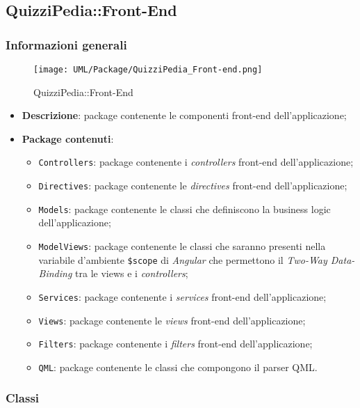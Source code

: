 \subsection{QuizziPedia::Front-End}
\subsubsection{Informazioni generali}
\label{QuizziPedia::Front-End}
\begin{figure}[ht]
	\centering
	\texttt{[image: UML/Package/QuizziPedia\_Front-end.png]}
	\caption{QuizziPedia::Front-End}
\end{figure}
\FloatBarrier
	\begin{itemize}
		\item \textbf{Descrizione}: package contenente le componenti front-end dell'applicazione;
		\item \textbf{Package contenuti}:
		\begin{itemize}
			\item \texttt{Controllers}: package contenente i \textit{controllers} front-end dell'applicazione;
			\item \texttt{Directives}: package contenente le \textit{directives} front-end dell'applicazione;
			\item \texttt{Models}: package contenente le classi che definiscono la business logic dell'applicazione;
			\item \texttt{ModelViews}: package contenente le classi che saranno presenti nella variabile d'ambiente \texttt{\$scope} di \textit{Angular} che permettono il \textit{Two-Way Data-Binding} tra le views e i \textit{controllers};
			\item \texttt{Services}: package contenente i \textit{services} front-end dell'applicazione;
			\item \texttt{Views}: package contenente le \textit{views} front-end dell'applicazione;
			\item \texttt{Filters}: package contenente i \textit{filters} front-end dell'applicazione;
			\item \texttt{QML}: package contenente le classi che compongono il parser QML.
		\end{itemize}
	\end{itemize}

\subsubsection{Classi}
	
	
	
	